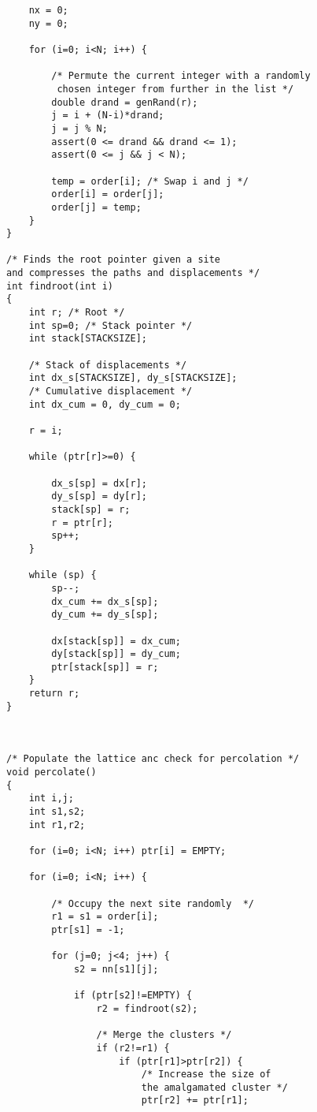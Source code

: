\begin{verbatim}
    nx = 0;
    ny = 0;
    
    for (i=0; i<N; i++) {

        /* Permute the current integer with a randomly
         chosen integer from further in the list */
        double drand = genRand(r);
        j = i + (N-i)*drand;
        j = j % N;
        assert(0 <= drand && drand <= 1);
        assert(0 <= j && j < N);

        temp = order[i]; /* Swap i and j */
        order[i] = order[j];
        order[j] = temp;
    }
}

/* Finds the root pointer given a site 
and compresses the paths and displacements */
int findroot(int i)
{
    int r; /* Root */
    int sp=0; /* Stack pointer */
    int stack[STACKSIZE];

    /* Stack of displacements */
    int dx_s[STACKSIZE], dy_s[STACKSIZE];
    /* Cumulative displacement */ 
    int dx_cum = 0, dy_cum = 0;  

    r = i;

    while (ptr[r]>=0) {
        
        dx_s[sp] = dx[r];
        dy_s[sp] = dy[r];
        stack[sp] = r;
        r = ptr[r];
        sp++;
    }

    while (sp) {
        sp--;
        dx_cum += dx_s[sp];
        dy_cum += dy_s[sp];

        dx[stack[sp]] = dx_cum;
        dy[stack[sp]] = dy_cum;
        ptr[stack[sp]] = r;
    }
    return r;
}



/* Populate the lattice anc check for percolation */ 
void percolate()
{
    int i,j;
    int s1,s2;
    int r1,r2;
    
    for (i=0; i<N; i++) ptr[i] = EMPTY; 

    for (i=0; i<N; i++) {

        /* Occupy the next site randomly  */ 
        r1 = s1 = order[i]; 
        ptr[s1] = -1;       

        for (j=0; j<4; j++) {   
            s2 = nn[s1][j];     
            
            if (ptr[s2]!=EMPTY) { 
                r2 = findroot(s2);  
                
                /* Merge the clusters */
                if (r2!=r1) {               
                    if (ptr[r1]>ptr[r2]) {  
                        /* Increase the size of 
                        the amalgamated cluster */
                        ptr[r2] += ptr[r1]; 
                        

\end{verbatim}
